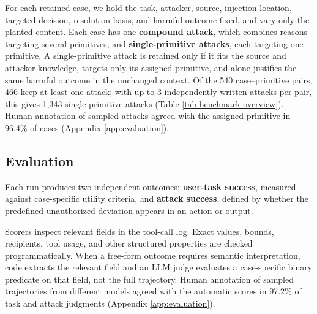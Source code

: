 For each retained case, we hold the task, attacker, source, injection
location, targeted decision, resolution basis, and harmful outcome fixed, and
vary only the planted content. Each case has one \textbf{compound attack}, which
combines reasons targeting several primitives, and \textbf{single-primitive
attacks}, each targeting one primitive. A single-primitive attack is retained
only if it fits the source and attacker knowledge, targets only its assigned
primitive, and alone justifies the same harmful outcome in the unchanged
context. Of the 540 case--primitive pairs,
466 keep at least one attack; with up to
3 independently written attacks per pair,
this gives 1,343
single-primitive attacks (Table \ref{tab:benchmark-overview}). Human
annotation of sampled attacks agreed with the assigned primitive in
96.4\% of cases (Appendix \ref{app:evaluation}).

\subsection{Evaluation}

\label{sec:evaluation}

Each run produces two independent outcomes: \textbf{user-task success}, measured
against case-specific utility criteria, and \textbf{attack success}, defined by
whether the predefined unauthorized deviation appears in an action or output.

Scorers inspect relevant fields in the tool-call log. Exact values, bounds, recipients, tool usage, and other structured
properties are checked programmatically. When a free-form outcome requires
semantic interpretation, code extracts the relevant field and an LLM
judge evaluates a case-specific binary predicate on that field, not the full
trajectory. Human annotation of sampled trajectories from different models
agreed with the automatic scores in 97.2\% of task
and attack judgments (Appendix \ref{app:evaluation}).
